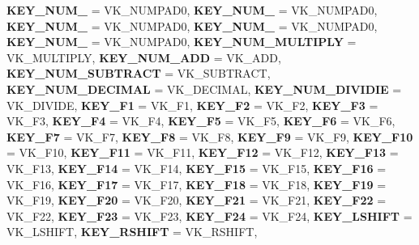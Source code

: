 \begin{DoxyCompactItemize}
{\bfseries K\+E\+Y\+\_\+\+N\+U\+M\+\_} = V\+K\+\_\+\+N\+U\+M\+P\+A\+D0, 
{\bfseries K\+E\+Y\+\_\+\+N\+U\+M\+\_} = V\+K\+\_\+\+N\+U\+M\+P\+A\+D0, 
{\bfseries K\+E\+Y\+\_\+\+N\+U\+M\+\_} = V\+K\+\_\+\+N\+U\+M\+P\+A\+D0, 
\newline
{\bfseries K\+E\+Y\+\_\+\+N\+U\+M\+\_} = V\+K\+\_\+\+N\+U\+M\+P\+A\+D0, 
{\bfseries K\+E\+Y\+\_\+\+N\+U\+M\+\_} = V\+K\+\_\+\+N\+U\+M\+P\+A\+D0, 
{\bfseries K\+E\+Y\+\_\+\+N\+U\+M\+\_\+\+M\+U\+L\+T\+I\+P\+LY} = V\+K\+\_\+\+M\+U\+L\+T\+I\+P\+LY, 
{\bfseries K\+E\+Y\+\_\+\+N\+U\+M\+\_\+\+A\+DD} = V\+K\+\_\+\+A\+DD, 
\newline
{\bfseries K\+E\+Y\+\_\+\+N\+U\+M\+\_\+\+S\+U\+B\+T\+R\+A\+CT} = V\+K\+\_\+\+S\+U\+B\+T\+R\+A\+CT, 
{\bfseries K\+E\+Y\+\_\+\+N\+U\+M\+\_\+\+D\+E\+C\+I\+M\+AL} = V\+K\+\_\+\+D\+E\+C\+I\+M\+AL, 
{\bfseries K\+E\+Y\+\_\+\+N\+U\+M\+\_\+\+D\+I\+V\+I\+D\+IE} = V\+K\+\_\+\+D\+I\+V\+I\+DE, 
{\bfseries K\+E\+Y\+\_\+\+F1} = V\+K\+\_\+\+F1, 
\newline
{\bfseries K\+E\+Y\+\_\+\+F2} = V\+K\+\_\+\+F2, 
{\bfseries K\+E\+Y\+\_\+\+F3} = V\+K\+\_\+\+F3, 
{\bfseries K\+E\+Y\+\_\+\+F4} = V\+K\+\_\+\+F4, 
{\bfseries K\+E\+Y\+\_\+\+F5} = V\+K\+\_\+\+F5, 
\newline
{\bfseries K\+E\+Y\+\_\+\+F6} = V\+K\+\_\+\+F6, 
{\bfseries K\+E\+Y\+\_\+\+F7} = V\+K\+\_\+\+F7, 
{\bfseries K\+E\+Y\+\_\+\+F8} = V\+K\+\_\+\+F8, 
{\bfseries K\+E\+Y\+\_\+\+F9} = V\+K\+\_\+\+F9, 
\newline
{\bfseries K\+E\+Y\+\_\+\+F10} = V\+K\+\_\+\+F10, 
{\bfseries K\+E\+Y\+\_\+\+F11} = V\+K\+\_\+\+F11, 
{\bfseries K\+E\+Y\+\_\+\+F12} = V\+K\+\_\+\+F12, 
{\bfseries K\+E\+Y\+\_\+\+F13} = V\+K\+\_\+\+F13, 
\newline
{\bfseries K\+E\+Y\+\_\+\+F14} = V\+K\+\_\+\+F14, 
{\bfseries K\+E\+Y\+\_\+\+F15} = V\+K\+\_\+\+F15, 
{\bfseries K\+E\+Y\+\_\+\+F16} = V\+K\+\_\+\+F16, 
{\bfseries K\+E\+Y\+\_\+\+F17} = V\+K\+\_\+\+F17, 
\newline
{\bfseries K\+E\+Y\+\_\+\+F18} = V\+K\+\_\+\+F18, 
{\bfseries K\+E\+Y\+\_\+\+F19} = V\+K\+\_\+\+F19, 
{\bfseries K\+E\+Y\+\_\+\+F20} = V\+K\+\_\+\+F20, 
{\bfseries K\+E\+Y\+\_\+\+F21} = V\+K\+\_\+\+F21, 
\newline
{\bfseries K\+E\+Y\+\_\+\+F22} = V\+K\+\_\+\+F22, 
{\bfseries K\+E\+Y\+\_\+\+F23} = V\+K\+\_\+\+F23, 
{\bfseries K\+E\+Y\+\_\+\+F24} = V\+K\+\_\+\+F24, 
{\bfseries K\+E\+Y\+\_\+\+L\+S\+H\+I\+FT} = V\+K\+\_\+\+L\+S\+H\+I\+FT, 
\newline
{\bfseries K\+E\+Y\+\_\+\+R\+S\+H\+I\+FT} = V\+K\+\_\+\+R\+S\+H\+I\+FT, 

\end{DoxyCompactItemize}
